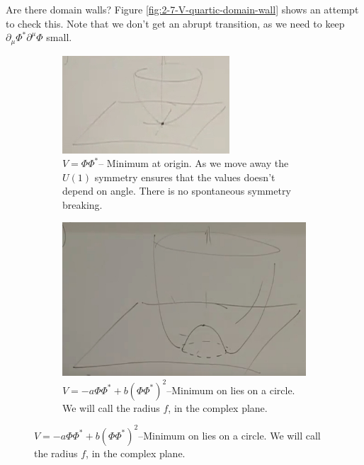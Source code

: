 \documentclass[]{article}
\begin{document}
Are there domain walls? Figure \ref{fig:2-7-V-quartic-domain-wall} shows an attempt to check this. Note that we don't get an abrupt transition, as we need to keep $\partial_\mu \Phi^* \partial^\mu \Phi$ small.

\begin{figure}[H]
	\caption{Potentials symmetric under $U(1)$}\label{fig:s-7-potentials}
	\begin{subfigure}[t]{0.45\textwidth}
		\caption{ $V=\Phi \Phi^*$-- Minimum at origin. As we move away the $U(1)$ symmetry ensures that the values doesn't depend on angle. There is no spontaneous symmetry breaking.}\label{fig:2-7-V-quad}
		\includegraphics[width=\textwidth]{2-7-V-quad}
	\end{subfigure}
	\hfill
	\begin{subfigure}[t]{0.45\textwidth}
		\caption{$V=-a \Phi \Phi^* + b (\Phi \Phi^*)^2$--Minimum on lies on a circle. We will call the radius $f$, in the complex plane.}\label{fig:2-7-V-quartic}
		\includegraphics[width=\textwidth]{2-7-V-quartic}

\end{subfigure}
\end{figure}
\end{document}
